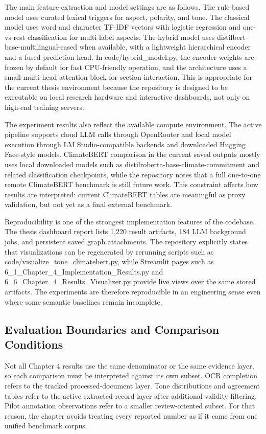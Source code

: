 \documentclass[english, online, cse, master]{dithesis}
\begin{document}
The main feature-extraction and model settings are as follows. The rule-based model uses curated lexical triggers for aspect, polarity, and tone. The classical model uses word and character TF-IDF vectors with logistic regression and one-vs-rest classification for multi-label aspects. The hybrid model uses distilbert-base-multilingual-cased when available, with a lightweight hierarchical encoder and a fused prediction head. In code/hybrid\_model.py, the encoder weights are frozen by default for fast CPU-friendly operation, and the architecture uses a small multi-head attention block for section interaction. This is appropriate for the current thesis environment because the repository is designed to be executable on local research hardware and interactive dashboards, not only on high-end training servers.

The experiment results also reflect the available compute environment. The active pipeline supports cloud LLM calls through OpenRouter and local model execution through LM Studio-compatible backends and downloaded Hugging Face-style models. ClimateBERT comparison in the current saved outputs mostly uses local downloaded models such as distilroberta-base-climate-commitment and related classification checkpoints, while the repository notes that a full one-to-one remote ClimateBERT benchmark is still future work. This constraint affects how results are interpreted: current ClimateBERT tables are meaningful as proxy validation, but not yet as a final external benchmark.

Reproducibility is one of the strongest implementation features of the codebase. The thesis dashboard report lists 1,220 result artifacts, 184 LLM background jobs, and persistent saved graph attachments. The repository explicitly states that visualizations can be regenerated by rerunning scripts such as code/visualize\_tone\_climatebert.py, while Streamlit pages such as 6\_1\_Chapter\_4\_Implementation\_Results.py and 6\_6\_Chapter\_4\_Results\_Visualizer.py provide live views over the same stored artifacts. The experiments are therefore reproducible in an engineering sense even where some semantic baselines remain incomplete.

\subsection{Evaluation Boundaries and Comparison Conditions}

Not all Chapter 4 results use the same denominator or the same evidence layer, so each comparison must be interpreted against its own subset. OCR completion refers to the tracked processed-document layer. Tone distributions and agreement tables refer to the active extracted-record layer after additional validity filtering. Pilot annotation observations refer to a smaller review-oriented subset. For that reason, the chapter avoids treating every reported number as if it came from one unified benchmark corpus.
\end{document}
